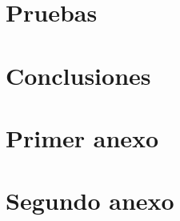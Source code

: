 \documentclass[12pt]{book}
\begin{document}
\chapter{Pruebas}

\chapter{Conclusiones}


\newpage


\clearpage

\appendix
\chapter{Primer anexo}


\chapter{Segundo anexo}


\end{document}
